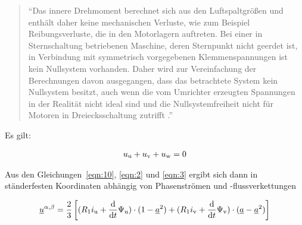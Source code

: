 \begin{quote}
\enquote{Das innere Drehmoment berechnet sich aus den Luftspaltgrößen und enthält daher keine mechanischen Verluste, wie zum Beispiel Reibungsverluste, die in den Motorlagern auftreten.
Bei einer in Sternschaltung betriebenen Maschine, deren Sternpunkt nicht geerdet ist, in Verbindung mit symmetrisch vorgegebenen Klemmenspannungen ist kein Nullsystem vorhanden.
Daher wird zur Vereinfachung der Berechnungen davon ausgegangen, dass das betrachtete System kein Nullsystem besitzt, auch wenn die vom Umrichter erzeugten Spannungen in der Realität nicht ideal sind und die Nullsystemfreiheit nicht für Motoren in Dreiecksschaltung zutrifft \autocite[S.~25]{kellner2012}.}
\end{quote}

Es gilt:

\begin{align}
u_{\mathrm{u}} + u_{\mathrm{v}} + u_{\mathrm{w}} = 0 \label{eqn:3}
\end{align}

Aus den Gleichungen~\ref{eqn:10}, \ref{eqn:2} und \ref{eqn:3} ergibt sich dann in ständerfesten Koordinaten abhängig von Phasenströmen und -flussverkettungen

\begin{align}
\underline{u}^{\alpha, \beta} = \frac{2}{3} \left[ (R_{\mathrm{1}}i_{\mathrm{u}} + \frac{\mathrm{d}}{\mathrm{d}t}\Psi_{\mathrm{u}})\cdot (1-\underline{a}^2) + (R_{\mathrm{1}}i_{\mathrm{v}} + \frac{\mathrm{d}}{\mathrm{d}t}\Psi_{\mathrm{v}})\cdot (\underline{a}-\underline{a}^2) \right]
\end{align}









